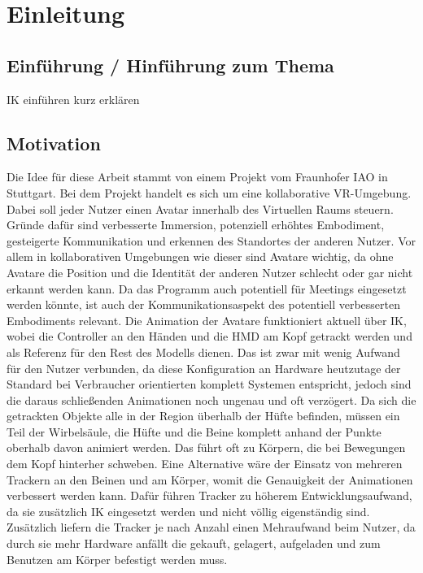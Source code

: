 \chapter{Einleitung}

\section{Einführung / Hinführung zum Thema}
IK einführen kurz erklären


\section{Motivation}
Die Idee für diese Arbeit stammt von einem Projekt vom Fraunhofer IAO in Stuttgart. Bei dem Projekt handelt es sich um eine kollaborative VR-Umgebung. Dabei soll jeder Nutzer einen Avatar innerhalb des Virtuellen Raums steuern. 
Gründe dafür sind verbesserte Immersion, potenziell erhöhtes Embodiment, gesteigerte Kommunikation und erkennen des Standortes der anderen Nutzer. Vor allem in kollaborativen Umgebungen wie dieser sind Avatare wichtig, da ohne Avatare die Position und die Identität der anderen Nutzer schlecht oder gar nicht erkannt werden kann. Da das Programm auch potentiell für Meetings eingesetzt werden könnte, ist auch der Kommunikationsaspekt des potentiell verbesserten Embodiments relevant. Die Animation der Avatare funktioniert aktuell über IK, wobei die Controller an den Händen und die HMD am Kopf getrackt werden und als Referenz für den Rest des Modells dienen. Das ist zwar mit wenig Aufwand für den Nutzer verbunden, da diese Konfiguration an Hardware heutzutage der Standard bei Verbraucher orientierten komplett Systemen entspricht, jedoch sind die daraus schließenden Animationen noch ungenau und oft verzögert. Da sich die getrackten Objekte alle in der Region überhalb der Hüfte befinden, müssen ein Teil der Wirbelsäule, die Hüfte und die Beine komplett anhand der Punkte oberhalb davon animiert werden. Das führt oft zu Körpern, die bei Bewegungen dem Kopf hinterher schweben.
Eine Alternative wäre der Einsatz von mehreren Trackern an den Beinen und am Körper, womit die Genauigkeit der Animationen verbessert werden kann. Dafür führen Tracker zu höherem Entwicklungsaufwand, da sie zusätzlich IK eingesetzt werden und nicht völlig eigenständig sind. Zusätzlich liefern die Tracker je nach Anzahl einen Mehraufwand beim Nutzer, da durch sie mehr Hardware anfällt die gekauft, gelagert, aufgeladen und zum Benutzen am Körper befestigt werden muss.



